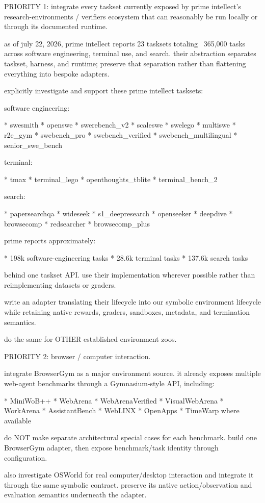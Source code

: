 PRIORITY 1: integrate every taskset currently exposed by prime intellect's research-environments / verifiers ecosystem that can reasonably be run locally or through its documented runtime.

as of july 22, 2026, prime intellect reports 23 tasksets totaling ~365,000 tasks across software engineering, terminal use, and search. their abstraction separates taskset, harness, and runtime; preserve that separation rather than flattening everything into bespoke adapters.

explicitly investigate and support these prime intellect tasksets:

software engineering:

* swesmith
* openswe
* swerebench_v2
* scaleswe
* swelego
* multiswe
* r2e_gym
* swebench_pro
* swebench_verified
* swebench_multilingual
* senior_swe_bench

terminal:

* tmax
* terminal_lego
* openthoughts_tblite
* terminal_bench_2

search:

* papersearchqa
* wideseek
* s1_deepresearch
* openseeker
* deepdive
* browsecomp
* redsearcher
* browsecomp_plus

prime reports approximately:

* 198k software-engineering tasks
* 28.6k terminal tasks
* 137.6k search tasks

behind one taskset API. use their implementation wherever possible rather than reimplementing datasets or graders.

write an adapter translating their lifecycle into our symbolic environment lifecycle while retaining native rewards, graders, sandboxes, metadata, and termination semantics.

do the same for OTHER established environment zoos.

PRIORITY 2: browser / computer interaction.

integrate BrowserGym as a major environment source. it already exposes multiple web-agent benchmarks through a Gymnasium-style API, including:

* MiniWoB++
* WebArena
* WebArenaVerified
* VisualWebArena
* WorkArena
* AssistantBench
* WebLINX
* OpenApps
* TimeWarp where available

do NOT make separate architectural special cases for each benchmark. build one BrowserGym adapter, then expose benchmark/task identity through configuration.

also investigate OSWorld for real computer/desktop interaction and integrate it through the same symbolic contract. preserve its native action/observation and evaluation semantics underneath the adapter.

